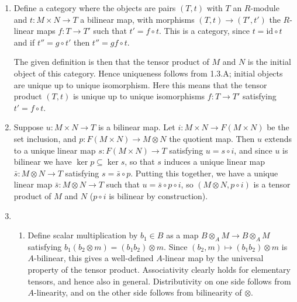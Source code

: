 \documentclass{report}
\newcommand{\induced}[1]{\bar{#1}} %
\newcommand{\id}{{\mathrm{id}}} %
\begin{document}
\begin{enumerate}[label=\textbf{1.3.\Alph*.}]
	\item Define a category where the objects are pairs $(T,t)$ with $T$ an
	      $R$-module and $t:M\times N\to T$ a bilinear map, with morphisms
	      $(T,t)\to(T',t')$ the $R$-linear maps $f:T\to T'$
	      such that $t'=f\circ t$. This is a category, since $t=\id\circ t$
	      and if $t''=g\circ t'$ then $t''=gf\circ t$.

	      The given definition is then that the tensor product of $M$ and $N$
	      is the initial object of this category. Hence uniqueness follows
	      from 1.3.A; initial objects are unique up to unique isomorphism.
	      Here this means that the tensor product $(T,t)$ is unique up to
	      unique isomorphisms $f:T\to T'$ satisfying $t'=f\circ t$.

	\item Suppose $u:M\times N\to T$ is a bilinear map. Let
	      $i:M\times N\to F(M\times N)$ be the set inclusion, and
	      $p:F(M\times N)\to M\otimes N$ the quotient map. Then $u$ extends to
	      a unique linear map $s:F(M\times N)\to T$ satisfying $u=s\circ i$,
	      and since $u$ is bilinear we have $\ker p\subseteq\ker s$, so that
	      $s$ induces a unique linear map $\induced{s}:M\otimes N\to T$
	      satisfying $s=\induced{s}\circ p$. Putting this together, we have a
	      unique linear map $\induced{s}:M\otimes N\to T$ such that
	      $u=\induced{s}\circ p\circ i$, so $(M\otimes N,p\circ i)$ is a tensor
	      product of $M$ and $N$ ($p\circ i$ is bilinear by construction).

	\item
	      \begin{enumerate}[label=(\alph*)]
		      \item Define scalar multiplication by $b_1\in B$ as a map
		            $B\otimes_AM\to B\otimes_AM$ satisfying
		            $b_1(b_2\otimes m)=(b_1b_2)\otimes m$. Since
		            $(b_2,m)\mapsto(b_1b_2)\otimes m$ is $A$-bilinear,
		            this gives a well-defined $A$-linear map by the universal
		            property of the tensor product. Associativity clearly holds
		            for elementary tensors, and hence also in general.
		            Distributivity on one side follows from $A$-linearity, and
		            on the other side follows from bilinearity of $\otimes$.


\end{enumerate}
\end{enumerate}
\end{document}

